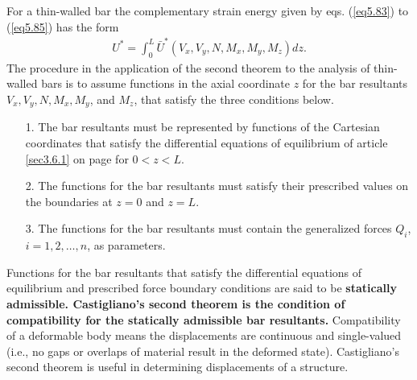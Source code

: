\documentclass{AeroStructure-ERJohnson}
\begin{document}
For a thin-walled bar the complementary strain energy given by eqs. (\ref{eq5.83}) to (\ref{eq5.85}) has the form
\begin{align}\label{eq5.89}
U^{*}=\int_{0}^{L} \bar{U}^{*}\left(V_{x}, V_{y}, N, M_{x}, M_{y}, M_{z}\right) d z.
\end{align}
The procedure in the application of the second theorem to the analysis of thin-walled bars is to assume functions in the axial coordinate $z$ for the bar resultants $V_{x}, V_{y}, N, M_{x}, M_{y}$, and $M_{z}$, that satisfy the three conditions below.
\begin{enumerate}
\item[1.] The bar resultants must be represented by functions of the Cartesian coordinates that satisfy the differential equations of equilibrium of article \ref{sec3.6.1} on page \pageref{sec3.6.1} for $0<z<L$.

\item[2.] The functions for the bar resultants must satisfy their prescribed values on the boundaries at $z = 0$ and $z = L$.

\item[3.] The functions for the bar resultants must contain the generalized forces $Q_{i}$, $i=1,2, \ldots, n$, as parameters.
\end{enumerate}

Functions for the bar resultants that satisfy the differential equations of equilibrium and prescribed force boundary conditions are said to be \textbf{statically admissible. Castigliano's second theorem is the condition of compatibility for the statically admissible bar resultants.} Compatibility of a deformable body means the displacements are continuous and single-valued (i.e., no gaps or overlaps of material result in the deformed state). Castigliano's second theorem is useful in determining displacements of a structure.

\vspace*{-10pt}
\end{document}
